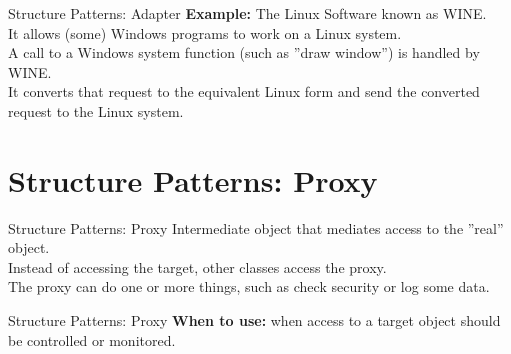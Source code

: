 \documentclass[14pt,aspectratio=169]{beamer}
\begin{document}
\begin{frame}{Structure Patterns: Adapter}
\textbf{Example:} The Linux Software known as WINE. \\
\vspace{1em}
It allows (some) Windows programs to work on a Linux system. \\
\vspace{1em}
A call to a Windows system function (such as ''draw window'') is handled by WINE.\\
\vspace{1em}
It converts that request to the equivalent Linux form and send the converted request to the Linux system. 
\end{frame}



\section*{Structure Patterns: Proxy}



\begin{frame}{Structure Patterns: Proxy}
Intermediate object that mediates access to the ''real'' object.\\
\vspace{1em}
Instead of accessing the target, other classes access the proxy.\\
\vspace{1em}
The proxy can do one or more things, such as check security or log some data.
\end{frame}



\begin{frame}{Structure Patterns: Proxy}
\large
\textbf{When to use:} when access to a target object should be controlled or monitored.
\end{frame}
\end{document}
